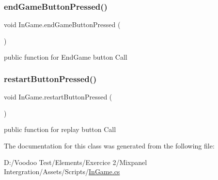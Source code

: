 \subsubsection{\texorpdfstring{end\+Game\+Button\+Pressed()}{endGameButtonPressed()}}
{\footnotesize\ttfamily void In\+Game.\+end\+Game\+Button\+Pressed (\begin{DoxyParamCaption}{ }\end{DoxyParamCaption})}



public function for End\+Game button Call 

\mbox{\label{class_in_game_a7c46fc262a084ee729b39c5883aa29cc}} 
\subsubsection{\texorpdfstring{restart\+Button\+Pressed()}{restartButtonPressed()}}
{\footnotesize\ttfamily void In\+Game.\+restart\+Button\+Pressed (\begin{DoxyParamCaption}{ }\end{DoxyParamCaption})}



public function for replay button Call 



The documentation for this class was generated from the following file\+:\begin{DoxyCompactItemize}
\item 
D\+:/\+Voodoo Test/\+Elements/\+Exercice 2/\+Mixpanel Intergration/\+Assets/\+Scripts/\mbox{\hyperlink{_in_game_8cs}{In\+Game.\+cs}}\end{DoxyCompactItemize}
